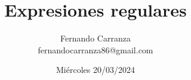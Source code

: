 \documentclass{beamer}
\title{Expresiones regulares}
\date{Miércoles 20/03/2024}
\author[Fernando Carranza]{Fernando Carranza\\fernandocarranza86@gmail.com}
\begin{document}
\begin{frame}
\maketitle
\end{frame}

\end{document}
